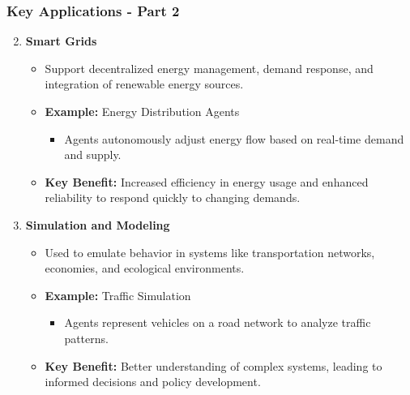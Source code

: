 \documentclass[aspectratio=169]{beamer}
\begin{document}
\begin{frame}[fragile]
    \frametitle{Key Applications - Part 2}
    \begin{enumerate}
        \setcounter{enumi}{1}
        \item \textbf{Smart Grids}
        \begin{itemize}
            \item Support decentralized energy management, demand response, and integration of renewable energy sources.
            \item \textbf{Example:} Energy Distribution Agents
                \begin{itemize}
                    \item Agents autonomously adjust energy flow based on real-time demand and supply.
                \end{itemize}
            \item \textbf{Key Benefit:} Increased efficiency in energy usage and enhanced reliability to respond quickly to changing demands.
        \end{itemize}
        
        \item \textbf{Simulation and Modeling}
        \begin{itemize}
            \item Used to emulate behavior in systems like transportation networks, economies, and ecological environments.
            \item \textbf{Example:} Traffic Simulation
                \begin{itemize}
                    \item Agents represent vehicles on a road network to analyze traffic patterns.
                \end{itemize}
            \item \textbf{Key Benefit:} Better understanding of complex systems, leading to informed decisions and policy development.
        \end{itemize}
    \end{enumerate}
\end{frame}
\end{document}

